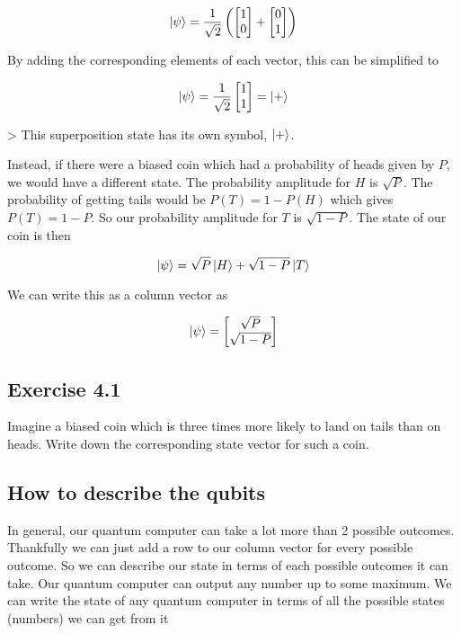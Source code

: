 \documentclass{book}
\begin{document}
$$ \ket{\psi} = \frac{1}{\sqrt{2}}\left(\begin{bmatrix}
1 \\ 0
\end{bmatrix}+ \begin{bmatrix}
0 \\ 1
\end{bmatrix}\right) $$

By adding the corresponding elements of each vector, this can be simplified to

$$ \ket{\psi} = \frac{1}{\sqrt{2}}\begin{bmatrix} 1 \\ 1 \end{bmatrix} = \ket{+}$$

> This superposition state has its own symbol, $\ket{+}$.

Instead, if there were a biased coin which had a probability of heads given by $P$, we would have a different state. The probability amplitude for $H$ is $\sqrt{P}$. The probability of getting tails would be $ P(T) = 1 - P(H)$ which gives $P(T) = 1 -P$. So our probability amplitude for $T$ is $\sqrt{1 - P}$. The state of our coin is then 

$$
\ket{\psi} = \sqrt{P}\ket{H} + \sqrt{1-P}\ket{T}
$$

We can write this as a column vector as

$$
\ket{\psi} = \begin{bmatrix}
\sqrt{P} \\ \sqrt{1-P}
\end{bmatrix}
$$


\hline
\subsection{Exercise 4.1 }

Imagine a biased coin which is three times more likely to land on tails than on heads. Write down the corresponding state vector for such a coin.

\hline
\subsection{How to describe the qubits}

In general, our quantum computer can take a lot more than 2 possible outcomes. Thankfully we can just add a row to our column vector for every possible outcome. So we can describe our state in terms of each possible outcomes it can take. Our quantum computer can output any number up to some maximum.  We can write the state of any quantum computer in terms of all the possible states (numbers) we can get from it
\end{document}
